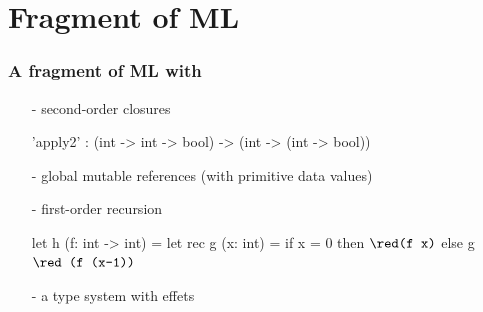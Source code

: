 \documentclass[xcolor=dvipsnames]{beamer}
\begin{document}

\section*{Fragment of ML}
\begin{frame}[fragile]
\frametitle{A fragment of ML with}
 \pause
\begin{itemize}
	\item[-] {\red second-order} closures  
	\begin{footnotesize}
	\begin{whycode}
	    'apply2' : (int -> int -> bool) -> (int -> (int -> bool)) \end{whycode}
	\end{footnotesize}	\pause
	\item[-] global {\red mutable} references (with primitive data values) \pause
	\item[-] {\red first-order} recursion 
	\begin{small}
	\begin{whycode}
	      let h (f: int -> int)
        = let rec g (x: int)
          = if x = 0 then ${\red\texttt{(f x)}}$ else g${\red\texttt{ (f (x-1))}}$ \end{whycode}
	\end{small}\pause
	\item[-] a type system {\red with effets}
\end{itemize}
\end{frame}
\end{document}
